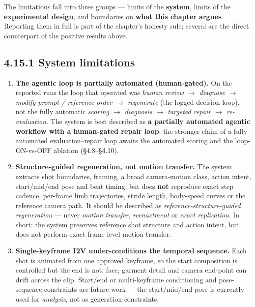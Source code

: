 \documentclass[10pt,twocolumn,letterpaper]{article}
\begin{document}
The limitations fall into three groups --- limits of the \textbf{system}, limits of the \textbf{experimental design}, and boundaries on \textbf{what this chapter argues}. Reporting them in full is part of the chapter's honesty rule; several are the direct counterpart of the positive results above.


\subsection*{4.15.1 System limitations}

\begin{enumerate}[leftmargin=1.4em,itemsep=2pt,topsep=2pt]

\item \textbf{The agentic loop is partially automated (human-gated).} On the reported runs the loop that operated was \emph{human review $\rightarrow$ diagnose $\rightarrow$ modify prompt / reference order $\rightarrow$ regenerate} (the logged decision loop), not the fully automatic \emph{scoring $\rightarrow$ diagnosis $\rightarrow$ targeted repair $\rightarrow$ re-evaluation}. The system is best described as \textbf{a partially automated agentic workflow with a human-gated repair loop}; the stronger claim of a fully automated evaluation--repair loop awaits the automated scoring and the loop-ON-vs-OFF ablation (\S{}4.8--\S{}4.10).

\item \textbf{Structure-guided regeneration, not motion transfer.} The system extracts shot boundaries, framing, a broad camera-motion class, action intent, start/mid/end pose and beat timing, but does \textbf{not} reproduce exact step cadence, per-frame limb trajectories, stride length, body-speed curves or the reference camera path. It should be described as \emph{reference-structure-guided regeneration} --- never \emph{motion transfer}, \emph{reenactment} or \emph{exact replication}. In short: the system preserves reference shot structure and action intent, but does not perform exact frame-level motion transfer.

\item \textbf{Single-keyframe I2V under-conditions the temporal sequence.} Each shot is animated from one approved keyframe, so the start composition is controlled but the end is not: face, garment detail and camera end-point can drift across the clip. Start/end or multi-keyframe conditioning and pose-sequence constraints are future work --- the start/mid/end pose is currently used for \emph{analysis}, not as generation constraints.


\end{enumerate}
\end{document}
